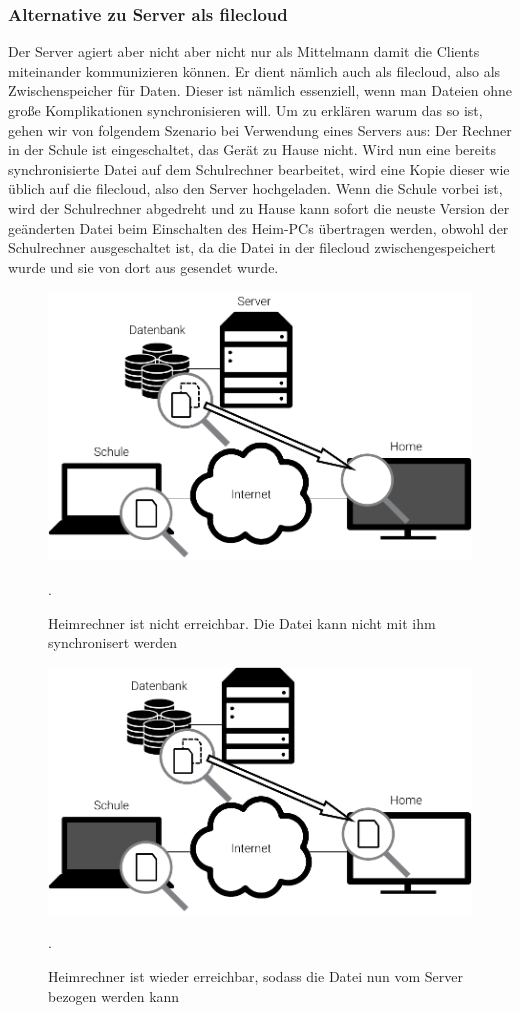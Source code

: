 \subsubsection{Alternative zu Server als \gls{filecloud}}
Der Server agiert aber nicht aber nicht nur als \glqq{} Mittelmann \grqq{} damit die
Clients miteinander kommunizieren können. Er dient nämlich auch als \gls{filecloud},
also als Zwischenspeicher für Daten. Dieser ist nämlich essenziell, wenn man
Dateien ohne große Komplikationen synchronisieren will. Um zu erklären warum das
so ist, gehen wir von folgendem Szenario bei Verwendung eines Servers aus:
Der Rechner in der Schule ist eingeschaltet, das Gerät zu Hause nicht. Wird nun
eine bereits synchronisierte Datei auf dem Schulrechner bearbeitet, wird eine Kopie dieser wie
üblich auf die \gls{filecloud}, also den Server hochgeladen. Wenn die Schule vorbei ist,
wird der Schulrechner abgedreht und zu Hause kann sofort die neuste Version der
geänderten  Datei beim Einschalten des Heim-PCs übertragen werden, obwohl der
Schulrechner ausgeschaltet ist, da die Datei in der \gls{filecloud}
zwischengespeichert wurde und sie von dort aus gesendet wurde.
\begin{figure}[h]
	\centering
  \includegraphics[]{images/dropbox_temp_1}
  \caption{Heimrechner ist nicht erreichbar. Die Datei kann nicht mit ihm
	synchronisert werden}.
\end{figure}
\begin{figure}[h]
	\centering
  \includegraphics[]{images/dropbox_temp_2}
  \caption{Heimrechner ist wieder erreichbar, sodass die Datei nun vom Server
	bezogen werden kann}.
\end{figure}

